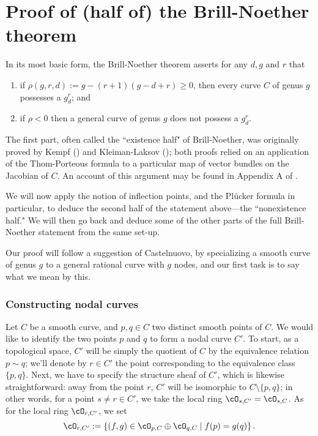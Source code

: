 \section{Proof of (half of) the Brill-Noether theorem}

In its most basic form, the Brill-Noether theorem asserts for any $d, g$ and $r$ that
\begin{enumerate}
\item if $\rho(g,r,d) := g - (r+1)(g-d+r) \geq 0$, then every curve $C$ of genus $g$ possesses a $g^r_d$; and
\item if $\rho < 0$ then a general curve of genus $g$ does not possess a $g^r_d$.
\end{enumerate}

The first part, often called the ``existence half" of Brill-Noether, was originally proved by Kempf (\cite{}) and Kleiman-Laksov (\cite{}); both proofs relied on an application of the Thom-Porteous formula to a particular map of vector bundles on the Jacobian of $C$. An account of this argument may  be found in Appendix A of \cite{}. 

We will now apply the notion of inflection points, and the Pl\"ucker formula in particular, to deduce the second half of the statement above---the ``nonexistence half." We will then go back and deduce some of the other parts of the  full Brill-Noether statement from the same set-up.

Our proof will follow a suggestion of Castelnuovo, by specializing a smooth curve of genus $g$ to a general rational curve with $g$ nodes, and our first task is to say what we mean by this.

\subsubsection{Constructing nodal curves}

Let $C$ be a smooth curve, and $p, q \in C$ two distinct smooth points of $C$. We would like to identify the two points $p$ and $q$ to form a nodal curve $C'$. To start, as a topological space, $C'$ will be simply the quotient of $C$ by the equivalence relation $p \sim q$; we'll denote by $r \in C'$ the point corresponding to the equivalence class $\{p, q\}$. Next, we have to specify the structure sheaf of $C'$, which is likewise straightforward: away from the point $r$, $C'$ will be isomorphic to $C \setminus \{p,q\}$; in other words, for a point $s \neq r \in C'$, we take the local ring $\cO_{s, C'} = \cO_{s,C}$. As for the local ring $\cO_{r, C'}$, we set
$$
\cO_{r, C'} := \left\{ (f,g) \in \cO_{p,C} \oplus \cO_{q,C} \mid f(p) = g(q) \right\}.
$$

